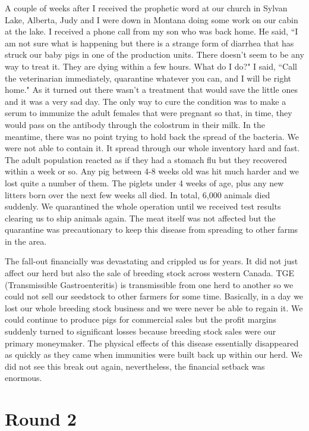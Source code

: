 \documentclass[oneside]{book}
\begin{document}
A couple of weeks after I received the prophetic word at our church in Sylvan Lake, Alberta, Judy and I were down in Montana doing some work on our cabin at the lake. I received a phone call from my son who was back home. He said, ``I am not sure what is happening but there is a strange form of diarrhea that has struck our baby pigs in one of the production units. There doesn't seem to be any way to treat it. They are dying within a few hours. What do I do?" I said, ``Call the veterinarian immediately, quarantine whatever you can, and I will be right home." As it turned out there wasn't a treatment that would save the little ones and it was a very sad day. The only way to cure the condition was to make a serum to immunize the adult females that were pregnant so that, in time, they would pass on the antibody through the colostrum in their milk. In the meantime, there was no point trying to hold back the spread of the bacteria. We were not able to contain it. It spread through our whole inventory hard and fast. The adult population reacted as if they had a stomach flu but they recovered within a week or so. Any pig between 4-8 weeks old was hit much harder and we lost quite a number of them. The piglets under 4 weeks of age, plus any new litters born over the next few weeks all died. In total, 6,000 animals died suddenly. We quarantined the whole operation until we received test results clearing us to ship animals again. The meat itself was not affected but the quarantine was precautionary to keep this disease from spreading to other farms in the area.

The fall-out financially was devastating and crippled us for years. It did not just affect our herd but also the sale of breeding stock across western Canada. TGE (Transmissible Gastroenteritis) is transmissible from one herd to another so we could not sell our seedstock to other farmers for some time. Basically, in a day we lost our whole breeding stock business and we were never be able to regain it. We could continue to produce pigs for commercial sales but the profit margins suddenly turned to significant losses because breeding stock sales were our primary moneymaker. The physical effects of this disease essentially disappeared as quickly as they came when immunities were built back up within our herd. We did not see this break out again, nevertheless, the financial setback was enormous. 


\section{Round 2}
\
\end{document}
